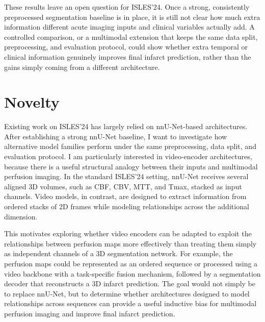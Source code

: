 These results leave an open question for ISLES'24. Once a strong, consistently preprocessed segmentation baseline is in place, it is still not clear how much extra information different acute imaging inputs and clinical variables actually add. A controlled comparison, or a multimodal extension that keeps the same data split, preprocessing, and evaluation protocol, could show whether extra temporal or clinical information genuinely improves final infarct prediction, rather than the gains simply coming from a different architecture.



\section{Novelty}
\label{nov}
Existing work on ISLES'24 has largely relied on nnU-Net-based architectures. After establishing a strong nnU-Net baseline, I want to investigate how alternative model families perform under the same preprocessing, data split, and evaluation protocol. I am particularly interested in video-encoder architectures, because there is a useful structural analogy between their inputs and multimodal perfusion imaging. In the standard ISLES'24 setting, nnU-Net receives several aligned 3D volumes, such as CBF, CBV, MTT, and Tmax, stacked as input channels. Video models, in contrast, are designed to extract information from ordered stacks of 2D frames while modeling relationships across the additional dimension.

This motivates exploring whether video encoders can be adapted to exploit the relationships between perfusion maps more effectively than treating them simply as independent channels of a 3D segmentation network. For example, the perfusion maps could be represented as an ordered sequence or processed using a video backbone with a task-specific fusion mechanism, followed by a segmentation decoder that reconstructs a 3D infarct prediction. The goal would not simply be to replace nnU-Net, but to determine whether architectures designed to model relationships across sequences can provide a useful inductive bias for multimodal perfusion imaging and improve final infarct prediction.

